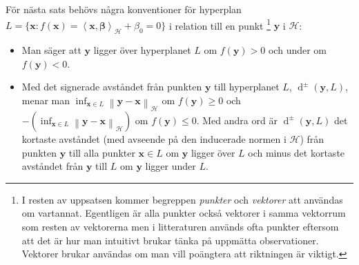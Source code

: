 \documentclass[a4paper, 12pt]{report}
\theoremstyle{definition}
\theoremstyle{remark}
\newcommand{\bfbeta}{{\boldsymbol{\beta}}}
\newcommand{\bfx}{\mathbf{x}}
\newcommand{\bfy}{\mathbf{y}}
\newcommand{\llangle}{\left\langle}
\newcommand{\rrangle}{\right\rangle}
\newcommand{\sephyp}{\{ \mathbf{x} : f\left(\mathbf{x}\right)=\inner{\bfx}{\bfbeta}_\mathcal{H} + \beta_0=0\}}
\newcommand{\inner}[2]{\llangle #1, #2 \rrangle}
\newcommand{\hil}{\mathcal{H}}
\begin{document}
För nästa sats behövs några konventioner för hyperplan $L=\sephyp$ i relation till en punkt
\footnote{I resten av uppsatsen kommer begreppen \emph{punkter} och \emph{vektorer} att användas om vartannat. Egentligen är alla punkter också vektorer i samma vektorrum som resten av vektorerna men i litteraturen används ofta punkter eftersom att det är hur man intuitivt brukar tänka på uppmätta observationer. Vektorer brukar användas om man vill poängtera att riktningen är viktigt.}
$\bfy$ i $\hil$:
\begin{itemize}
	\item Man säger att $\bfy$ ligger över hyperplanet $L$ om $f\left(\bfy\right)>0$ och under om $f\left(\bfy\right)<0$.
	\item Med det signerade avståndet från punkten $\bfy$ till hyperplanet $L$, $\operatorname{d}^\pm\left(\bfy,L\right)$, menar man $\inf_{\bfx\in L} \left\|\bfy-\bfx\right\|_\hil$ om $f\left(\bfy\right)\geq0$ och $-\left(\inf_{\bfx\in L} \left\|\bfy-\bfx\right\|_\hil\right)$ om $f\left(\bfy\right)\leq0$.
	Med andra ord är $\operatorname{d}^\pm\left(\bfy,L\right)$ det kortaste avståndet (med avseende på den inducerade normen i $\hil$) från punkten $\bfy$ till alla punkter $\bfx\in L$ om $\bfy$ ligger över $L$ och minus det kortaste avståndet från $\bfy$ till $L$ om $\bfy$ ligger under $L$.
\end{itemize}
\end{document}
